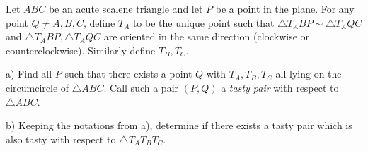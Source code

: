 Let $ABC$ be an acute scalene triangle and let $P$ be a point in the plane. For any point $Q\neq A,B,C$, define $T_A$ to be the unique point such that $\triangle T_ABP \sim \triangle T_AQC$ and $\triangle T_ABP, \triangle T_AQC$ are oriented in the same direction (clockwise or counterclockwise). Similarly define $T_B, T_C$.

a) Find all $P$ such that there exists a point $Q$ with $T_A,T_B,T_C$ all lying on the circumcircle of $\triangle ABC$. Call such a pair $(P,Q)$ a \textit{tasty pair} with respect to $\triangle ABC$.

b) Keeping the notations from a), determine if there exists a tasty pair which is also tasty with respect to $\triangle T_AT_BT_C$.

